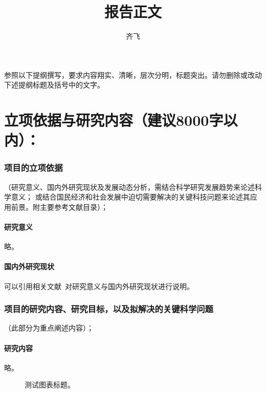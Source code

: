 \documentclass[subfig,boldtoc]{mynsfc}
\title{报告正文}
\author{齐飞}
\begin{document}
\thispagestyle{empty}

\maketitle


参照以下提纲撰写，要求内容翔实、清晰，层次分明，标题突出。请勿删除或改动下述提纲标题及括号中的文字。

\part{立项依据与研究内容（建议8000字以内）： }
\label{part:proposal}

\section{项目的立项依据}{（研究意义、国内外研究现状及发展动态分析，需结合科学研究发展趋势来论述科学意义；
  或结合国民经济和社会发展中迫切需要解决的关键科技问题来论述其应用前景。附主要参考文献目录）；}
\label{sec:background}

\subsection{研究意义}
\label{sec:motivation}

略。

\subsection{国内外研究现状}
\label{sec:review}

可以引用相关文献~\cite{bengio_representation_2013}对研究意义与国内外研究现状进行说明。

\printbibliography[heading=reftype,title={参考文献}]

\section{项目的研究内容、研究目标，以及拟解决的关键科学问题}{（此部分为重点阐述内容）；}
\label{sec:contents}

\subsection{研究内容}

略。

\begin{figure}[h]
  \centering
  
  \caption{测试图表标题。}
  \label{fig:test}
\end{figure}
\end{document}
